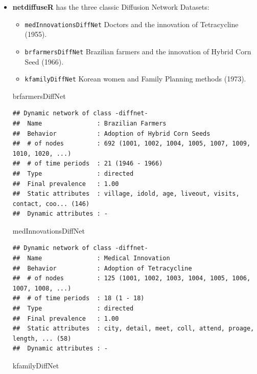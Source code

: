 \documentclass[]{book}
\newenvironment{Shaded}{\begin{snugshade}}{\end{snugshade}}
\newcommand{\NormalTok}[1]{#1}
\providecommand{\tightlist}{%
  \setlength{\itemsep}{0pt}\setlength{\parskip}{0pt}}
\begin{document}
\begin{itemize}
\item
  \textbf{netdiffuseR} has the three classic Diffusion Network Datasets:

  \begin{itemize}
  \tightlist
  \item
    \texttt{medInnovationsDiffNet} Doctors and the innovation of Tetracycline (1955).
  \item
    \texttt{brfarmersDiffNet} Brazilian farmers and the innovation of Hybrid Corn Seed (1966).
  \item
    \texttt{kfamilyDiffNet} Korean women and Family Planning methods (1973).
  \end{itemize}

\begin{Shaded}
\begin{Highlighting}[]
\NormalTok{brfarmersDiffNet}
\end{Highlighting}
\end{Shaded}

\begin{verbatim}
## Dynamic network of class -diffnet-
##  Name               : Brazilian Farmers
##  Behavior           : Adoption of Hybrid Corn Seeds
##  # of nodes         : 692 (1001, 1002, 1004, 1005, 1007, 1009, 1010, 1020, ...)
##  # of time periods  : 21 (1946 - 1966)
##  Type               : directed
##  Final prevalence   : 1.00
##  Static attributes  : village, idold, age, liveout, visits, contact, coo... (146)
##  Dynamic attributes : -
\end{verbatim}

\begin{Shaded}
\begin{Highlighting}[]
\NormalTok{medInnovationsDiffNet}
\end{Highlighting}
\end{Shaded}

\begin{verbatim}
## Dynamic network of class -diffnet-
##  Name               : Medical Innovation
##  Behavior           : Adoption of Tetracycline
##  # of nodes         : 125 (1001, 1002, 1003, 1004, 1005, 1006, 1007, 1008, ...)
##  # of time periods  : 18 (1 - 18)
##  Type               : directed
##  Final prevalence   : 1.00
##  Static attributes  : city, detail, meet, coll, attend, proage, length, ... (58)
##  Dynamic attributes : -
\end{verbatim}

\begin{Shaded}
\begin{Highlighting}[]
\NormalTok{kfamilyDiffNet}
\end{Highlighting}
\end{Shaded}


\end{itemize}
\end{document}
